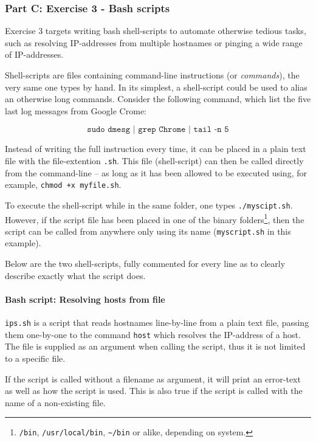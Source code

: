 \pagebreak
\subsubsection{Part C: Exercise 3 - Bash scripts}
Exercise 3 targets writing bash shell-scripts to automate otherwise tedious
tasks, such as resolving IP-addresses from multiple hostnames or pinging a
wide range of IP-addresses.

Shell-scripts are files containing command-line instructions (or \textit{commands}),
the very same one types by hand. In its simplest, a shell-script could be used to alias an
otherwise long commands. Consider the following command, which list the five last log
messages from Google Crome:

$$\texttt{sudo dmesg | grep Chrome | tail -n 5}$$

Instead of writing the full instruction every time, it can be placed in a plain
text file with the file-extention \texttt{.sh}. This file (shell-script) can
then be called directly from the command-line -- as long as it has been allowed
to be executed using, for example, \texttt{chmod +x myfile.sh}.

To execute the shell-script while in the same folder, one types
\texttt{./myscipt.sh}. However, if the script file has been placed in one of the
binary folders\footnote{\texttt{/bin}, \texttt{/usr/local/bin}, \texttt{\textasciitilde/bin}
  or alike, depending on system.}, then the script can be called from anywhere only
using its name (\texttt{myscript.sh} in this example).

Below are the two shell-scripts, fully commented for every line as to
clearly describe exactly what the script does.

\paragraph{Bash script: Resolving hosts from file}
\texttt{ips.sh} is a script that reads hostnames line-by-line from a plain text file,
passing them one-by-one to the command \texttt{host} which resolves the IP-address of
a host. The file is supplied as an argument when calling the script, thus it is not
limited to a specific file.

If the script is called without a filename as argument, it will print an error-text
as well as how the script is used. This is also true if the script is called with
the name of a non-existing file.



